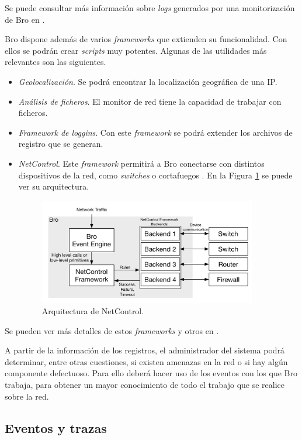 \intro Se puede consultar más información sobre \textit{logs} generados por una monitorización de Bro en \cite{brologs}.

\intro Bro dispone además de varios \textit{frameworks} que extienden su funcionalidad. Con ellos se podrán crear \textit{scripts} muy 
potentes. Algunas de las utilidades más relevantes son las siguientes.
\begin{itemize}
\item \textit{Geolocalización}. Se podrá encontrar la localización geográfica de una IP.
\item \textit{Análisis de ficheros}. El monitor de red tiene la capacidad de trabajar con ficheros.
\item \textit{Framework de loggins}. Con este \textit{framework} se podrá extender los archivos de registro que se generan.
\item \textit{NetControl}. Este \textit{framework} permitirá a Bro conectarse con distintos dispositivos de la red, como 
\textit{switches} o cortafuegos \cite{bronetcontrol}. En la Figura \ref{fig.netcontrol} se puede ver su arquitectura.
\begin{figure}[H]
  \includegraphics[width=0.9\textwidth]{imagenes/netcarquitectura.png}
  \centering
  \caption{Arquitectura de NetControl.}\label{fig.netcontrol}
\end{figure}
\end{itemize}

\intro Se pueden ver más detalles de estos \textit{frameworks} y otros en \cite{broframeworks}.

\intro A partir de la información de los registros, el administrador del sistema podrá determinar, entre otras cuestiones, si existen 
amenazas en la red o si hay algún componente defectuoso. Para ello deberá hacer uso de los eventos con los que Bro trabaja, para 
obtener un mayor conocimiento de todo el trabajo que se realice sobre la red.

\subsection{Eventos y trazas}

